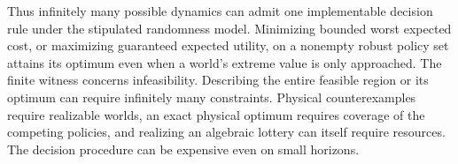 Thus infinitely many possible dynamics can admit one implementable decision rule under the stipulated randomness model. Minimizing bounded worst expected cost, or maximizing guaranteed expected utility, on a nonempty robust policy set attains its optimum even when a world's extreme value is only approached. The finite witness concerns infeasibility. Describing the entire feasible region or its optimum can require infinitely many constraints. Physical counterexamples require realizable worlds, an exact physical optimum requires coverage of the competing policies, and realizing an algebraic lottery can itself require resources. The decision procedure can be expensive even on small horizons.
